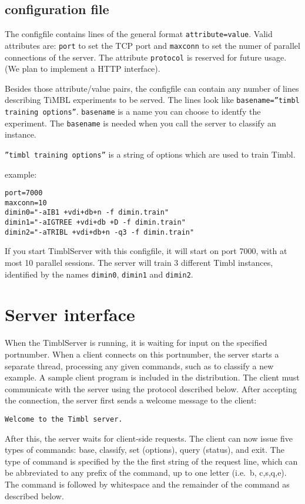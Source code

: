 \documentclass{report}
\begin{document}
\subsection{configuration file}
\label{configfile}
The configfile contains lines of the general format {\tt attribute=value}.
Valid attributes are: {\tt port} to set the TCP port and {\tt maxconn} to set the numer of parallel connections of the server. The attribute {\tt protocol} is reserved for future usage. (We plan to implement a HTTP interface).

Besides those attribute/value pairs, the configfile can contain any number of lines describing TiMBL experiments to be served. The lines look like {\tt basename=''timbl training options''}.
{\tt basename} is a name you can choose to identfy the experiment. The {\tt basename} is needed when you call the server to classify an instance. 

{\tt ''timbl training options''} is a string of options which are used to train Timbl.

example:
\begin{verbatim}
port=7000
maxconn=10
dimin0="-aIB1 +vdi+db+n -f dimin.train"
dimin1="-aIGTREE +vdi+db +D -f dimin.train"
dimin2="-aTRIBL +vdi+db+n -q3 -f dimin.train"
\end{verbatim}

If you start TimblServer with this configfile, it will start on port 7000, with at most 10 parallel sessions. The server will train 3 different Timbl instances, identified by the names {\tt dimin0}, {\tt dimin1} and {\tt dimin2}.

\section{Server interface}
\label{serverformat}

When the TimblServer is running, it is waiting for input on the specified portnumber. When a client connects on this portnumber, the server starts a separate thread, processing any given commands, such as to classify a new example. A sample client program is included in the distribution. The client must communicate with the server using the protocol described below. After accepting the connection, the server first sends a welcome message to the client:

{\tt Welcome to the Timbl server.}

After this, the server waits for client-side requests.  The client can now issue five types of commands: base, classify, set (options), query (status), and exit. The type of command is specified by the the first string of the request line, which can be abbreviated to any prefix of the command, up to one letter (i.e.~b, c,s,q,e). The command is followed by whitespace and the remainder of the command as described below.
\end{document}
